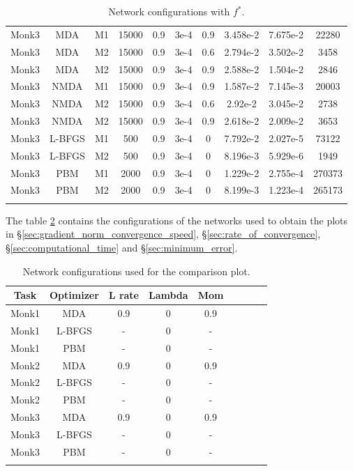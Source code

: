 \begin{center}
\begin{longtable}{|c|c|c|c|c|c|c|c|c|c|}
			Monk3 & MDA & M1 & 15000 & 0.9 & 3e-4  & 0.9 & 3.458e-2 & 7.675e-2 & 22280 \\
			Monk3 & MDA & M2 & 15000 & 0.9 & 3e-4  & 0.6 & 2.794e-2 & 3.502e-2 & 3458 \\
			Monk3 & MDA & M2 & 15000 & 0.9 & 3e-4  & 0.9 &  2.588e-2 & 1.504e-2 & 2846  \\
			Monk3 & NMDA & M1 & 15000 & 0.9 & 3e-4  & 0.9 & 1.587e-2 & 7.145e-3 & 20003 \\
			Monk3 & NMDA & M2 & 15000 & 0.9 & 3e-4  & 0.6 & 2.92e-2 & 3.045e-2 & 2738 \\
			Monk3 & NMDA & M2 & 15000 & 0.9 & 3e-4  & 0.9 & 2.618e-2 & 2.009e-2 & 3653 \\
			Monk3 & L-BFGS & M1 & 500 & 0.9 & 3e-4  & 0 & 7.792e-2 & 2.027e-5 & 73122 \\
			Monk3 & L-BFGS & M2 & 500 & 0.9 & 3e-4  & 0 & 8.196e-3 & 5.929e-6 & 1949 \\
			Monk3 & PBM & M1 & 2000 & 0.9 & 3e-4  & 0 & 1.229e-2 & 2.755e-4 & 270373 \\
			Monk3 & PBM & M2 & 2000 & 0.9 & 3e-4  & 0 & 8.199e-3 & 1.223e-4 & 265173  \\
			\hline
			\caption{Network configurations with $f^*$.}
			\label{tab:nets_res}
		\end{longtable}

\end{center}

The table \ref{tab:nets_comp} contains the configurations of the networks used to obtain the plots in \S \ref{sec:gradient_norm_convergence_speed}, \S \ref{sec:rate_of_convergence}, \S \ref{sec:computational_time} and \S \ref{sec:minimum_error}. 

\begin{center}
	\small\addtolength{\tabcolsep}{-3pt}
	\centering
	\begin{longtable}{|c|c|c|c|c|c|c|c|c|}
		\hline
		\textbf{Task}& \textbf{Optimizer} & \textbf{L rate} & \multicolumn{1}{l|}{\textbf{Lambda}} & \textbf{Mom}  \\ \hline 
		Monk1 & MDA & 0.9 & 0 & 0.9    \\
		Monk1 & L-BFGS & - & 0 & -    \\
		Monk1 & PBM & - & 0 & -    \\
		Monk2 & MDA & 0.9 & 0 & 0.9    \\
		Monk2 & L-BFGS & - & 0 & -    \\
		Monk2 & PBM & - & 0 & -    \\
		Monk3 & MDA & 0.9 & 0 & 0.9    \\
		Monk3 & L-BFGS & - & 0 & -    \\
		Monk3 & PBM & - & 0 & -    \\
		\hline
		\caption{Network configurations used for the comparison plot.}
		\label{tab:nets_comp}
	\end{longtable}
\end{center}


